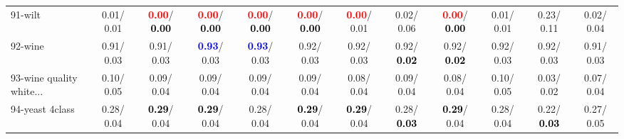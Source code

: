 \begin{table}[h]
\begin{center}
{\begin{tabular}{lc|c|c|c|c|c|c|c|c|c|c}
91-wilt &   0.01/  0.01 & \textcolor{red}{\textbf{  0.00}}/\textcolor{black}{\textbf{  0.00}} & \textcolor{red}{\textbf{  0.00}}/\textcolor{black}{\textbf{  0.00}} & \textcolor{red}{\textbf{  0.00}}/\textcolor{black}{\textbf{  0.00}} & \textcolor{red}{\textbf{  0.00}}/\textcolor{black}{\textbf{  0.00}} & \textcolor{red}{\textbf{  0.00}}/  0.01 &   0.02/  0.06 & \textcolor{red}{\textbf{  0.00}}/\textcolor{black}{\textbf{  0.00}} &   0.01/  0.01 &   0.23/  0.11 &   0.02/  0.04 \\
92-wine &   0.91/  0.03 &   0.91/  0.03 & \textcolor{blue}{\textbf{  0.93}}/  0.03 & \textcolor{blue}{\textbf{  0.93}}/  0.03 &   0.92/  0.03 &   0.92/  0.03 &   0.92/\textcolor{black}{\textbf{  0.02}} &   0.92/\textcolor{black}{\textbf{  0.02}} &   0.92/  0.03 &   0.92/  0.03 &   0.91/  0.03 \\ \hline
93-wine quality white... &   0.10/  0.05 &   0.09/  0.04 &   0.09/  0.04 &   0.09/  0.04 &   0.09/  0.04 &   0.08/  0.04 &   0.09/  0.04 &   0.08/  0.04 &   0.10/  0.05 &   0.03/  0.02 &   0.07/  0.04 \\
94-yeast 4class &   0.28/  0.04 & \textcolor{black}{\textbf{  0.29}}/  0.04 & \textcolor{black}{\textbf{  0.29}}/  0.04 &   0.28/  0.04 & \textcolor{black}{\textbf{  0.29}}/  0.04 & \textcolor{black}{\textbf{  0.29}}/  0.04 &   0.28/\textcolor{black}{\textbf{  0.03}} & \textcolor{black}{\textbf{  0.29}}/  0.04 &   0.28/  0.04 &   0.22/\textcolor{black}{\textbf{  0.03}} &   0.27/  0.05 \\\end{tabular}
}\label{strats2aNB}
\end{center}
\end{table}
